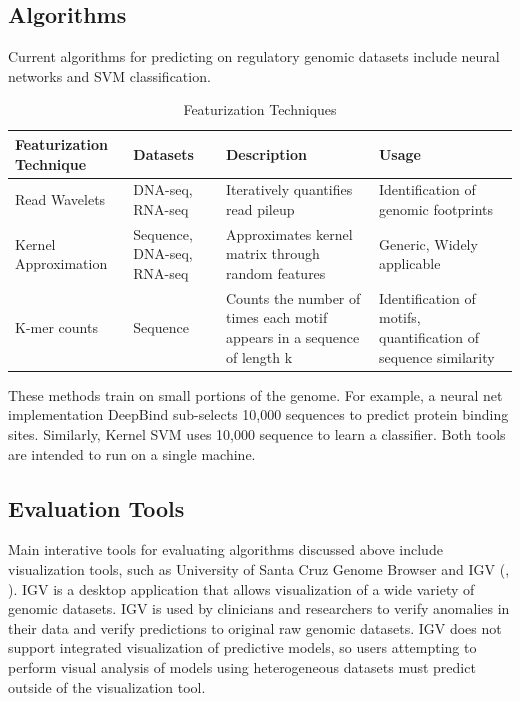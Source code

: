 \documentclass{sig-alternate-05-2015}
\begin{document}
\subsection{Algorithms}
Current algorithms for predicting on regulatory genomic datasets include neural networks and SVM classification.
\begin{table}[t]
\centering
\caption{Featurization Techniques}
\label{table:featurization}
\begin{tabular}{| L{2cm} | L{1.45cm} | L{2cm} | L{1.75cm} |}
\hline
Featurization Technique & Datasets & Description & Usage
\\ \hline
Read Wavelets \newline
\cite{wavelets}         & DNA-seq, RNA-seq           & Iteratively quantifies read pileup                                 & Identification of genomic footprints \\ \hline
Kernel Approximation
\cite{tfbinding} & Sequence, DNA-seq,
RNA-seq & Approximates kernel matrix through random features & Generic, Widely applicable \cite{alipanahi2015predicting}                                       \\ \hline
K-mer counts & Sequence & Counts the number of times each motif
appears in a sequence of length k & Identification
of motifs, quantification of sequence similarity \\ \hline
\end{tabular}
\end{table}
These methods train on small portions of the genome. For example, a neural net implementation DeepBind sub-selects 10,000 sequences to predict protein binding sites. Similarly, Kernel SVM uses 10,000 sequence to learn a classifier. Both tools are intended to run on a single machine. \\

\subsection{Evaluation Tools}
Main interative tools for evaluating algorithms discussed above include visualization tools, such as University of Santa Cruz Genome Browser and IGV (\cite{ucscbrowser}, \cite{igv2011}). IGV is a desktop application that allows visualization of a wide variety of genomic datasets. IGV is used by clinicians and researchers to verify anomalies in their data and verify predictions to original raw genomic datasets. IGV does not support integrated visualization of predictive models, so users attempting to perform visual analysis of models using heterogeneous datasets must predict outside of the visualization tool.
\end{document}

